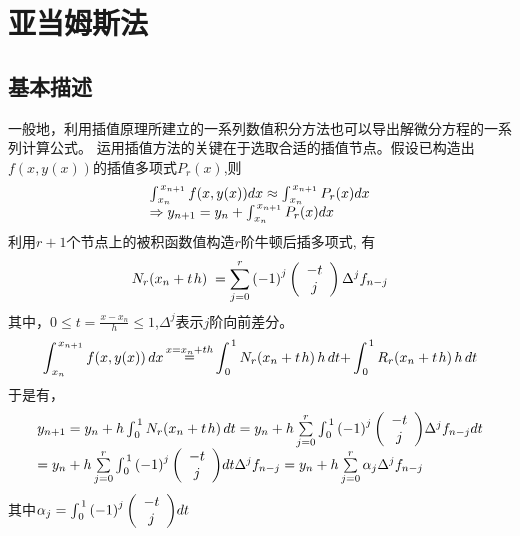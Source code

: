 \documentclass[a4paper,12pt]{article}
\begin{document}
\section{亚当姆斯法}
\subsection{基本描述}
一般地，利用插值原理所建立的一系列数值积分方法也可以导出解微分方程的一系列计算公式。
运用插值方法的关键在于选取合适的插值节点。假设已构造出$f(x,y(x))$的插值多项式$P_r(x)$,则
\[\begin{array}{l}
\int_{{\kern 1pt} {x_n}}^{{\kern 1pt} {x_{n + 1}}} {f(x,y(x))dx}  \approx \int_{{\kern 1pt} {x_n}}^{{\kern 1pt} {x_{n + 1}}} {{P_r}(x)dx} \\
 \Rightarrow {y_{n + 1}} = {y_n} + \int_{{\kern 1pt} {x_n}}^{{\kern 1pt} {x_{n + 1}}} {{P_r}(x)dx}
\end{array}\]
利用$r+1$个节点上的被积函数值构造$r$阶牛顿后插多项式, 有
\[{N_r}({x_n} + t{\kern 1pt} h)\; = \sum\limits_{j = 0}^r {{{\left( { - 1} \right)}^j}} \left( {\begin{array}{*{20}{c}}
{ - t}\\
j
\end{array}} \right){\Delta ^j}{f_{n - j}}\]
其中，$0 \le t = \frac{{x - {x_n}}}{h} \le 1$,${\Delta ^j}$表示$j$阶向前差分。
\[\int_{{\kern 1pt} {x_n}}^{{\kern 1pt} {x_{n + 1}}} {f(x,y(x))\,dx\mathop  = \limits^{x = {x_n} + th} \int_{{\kern 1pt} 0}^{{\kern 1pt} 1} {{N_r}({x_n} + t{\kern 1pt} h)\,h\,dt + } } \int_{{\kern 1pt} 0}^{{\kern 1pt} 1} {{R_r}({x_n} + t{\kern 1pt} h)\,h\,dt} \]
于是有，
\[\begin{array}{l}
{y_{n + 1}} = {y_n} + h\int_{{\kern 1pt} 0}^{{\kern 1pt} 1} {{N_r}(} {x_n} + t{\kern 1pt} h)\,dt = {y_n} + h\sum\limits_{j = 0}^r {\int_{{\kern 1pt} 0}^{{\kern 1pt} 1} {{{\left( { - 1} \right)}^j}\left( {\begin{array}{*{20}{c}}
{ - t}\\
j
\end{array}} \right)} {\Delta ^j}{f_{n - j}}dt} \\
 = {y_n} + h\sum\limits_{j = 0}^r {\int_{{\kern 1pt} 0}^{{\kern 1pt} 1} {{{\left( { - 1} \right)}^j}\left( {\begin{array}{*{20}{c}}
{ - t}\\
j
\end{array}} \right)} dt} {\Delta ^j}{f_{n - j}} = {y_n} + h\sum\limits_{j = 0}^r {{\alpha _j}} {\Delta ^j}{f_{n - j}}
\end{array}\]
其中${\alpha _j} = \int_{{\kern 1pt} 0}^{{\kern 1pt} 1} {{{\left( { - 1} \right)}^j}\left( {\begin{array}{*{20}{c}}
{ - t}\\
j
\end{array}} \right)} dt$
\end{document}
